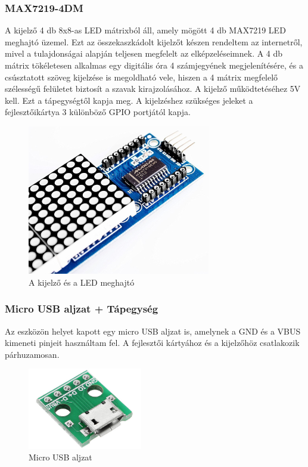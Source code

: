 \documentclass[a4paper, 12pt]{article}
\begin{document}
\subsubsection{MAX7219-4DM}
A kijelző 4 db 8x8-as LED mátrixból áll, amely mögött 4 db MAX7219 LED meghajtó üzemel. Ezt az összekaszkádolt kijelzőt készen rendeltem az internetről, mivel a tulajdonságai alapján teljesen megfelelt az elképzeléseimnek. A 4 db mátrix tökéletesen alkalmas egy digitális óra 4 számjegyének megjelenítésére, és a csúsztatott szöveg kijelzése is megoldható vele, hiszen a 4 mátrix megfelelő szélességű felületet biztosít a szavak kirajzolásához.
A kijelző működtetéséhez 5V kell. Ezt a tápegységtől kapja meg. A kijelzéshez szükséges jeleket a fejlesztőikártya 3 különböző GPIO portjától kapja.

\begin{figure}[ht]
	\centering
	\includegraphics[width = 8cm]{images/matrix.jpg}
	\caption{A kijelző és a LED meghajtó}
	\label{fig:matrix}
\end{figure}	

\subsubsection{Micro USB aljzat + Tápegység}

Az eszközön helyet kapott egy micro USB aljzat is, amelynek a GND és a VBUS kimeneti pinjeit használtam fel. A fejlesztői kártyához és a kijelzőhöz csatlakozik párhuzamosan.

\begin{figure}[ht]
	\centering
	\includegraphics[width = 5cm]{images/dip5.jpg}
	\caption{Micro USB aljzat}
	\label{fig:dip5}
\end{figure}
\end{document}
